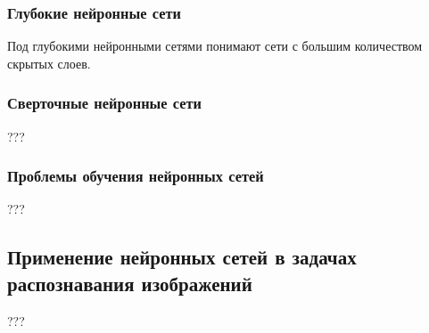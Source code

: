 \subsubsection{Глубокие нейронные сети}
Под глубокими нейронными сетями понимают сети с большим количеством скрытых слоев.
\subsubsection{Сверточные нейронные сети}
???
\subsubsection{Проблемы обучения нейронных сетей}
???
\subsection{Применение нейронных сетей в задачах распознавания изображений}
???
\clearpage